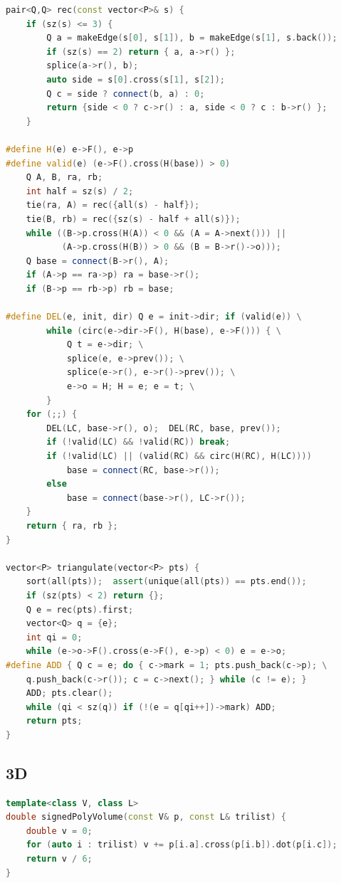 \begin{multicols}{\Columns}
\begin{lstlisting}[language=C++]
pair<Q,Q> rec(const vector<P>& s) {
	if (sz(s) <= 3) {
		Q a = makeEdge(s[0], s[1]), b = makeEdge(s[1], s.back());
		if (sz(s) == 2) return { a, a->r() };
		splice(a->r(), b);
		auto side = s[0].cross(s[1], s[2]);
		Q c = side ? connect(b, a) : 0;
		return {side < 0 ? c->r() : a, side < 0 ? c : b->r() };
	}

#define H(e) e->F(), e->p
#define valid(e) (e->F().cross(H(base)) > 0)
	Q A, B, ra, rb;
	int half = sz(s) / 2;
	tie(ra, A) = rec({all(s) - half});
	tie(B, rb) = rec({sz(s) - half + all(s)});
	while ((B->p.cross(H(A)) < 0 && (A = A->next())) ||
	       (A->p.cross(H(B)) > 0 && (B = B->r()->o)));
	Q base = connect(B->r(), A);
	if (A->p == ra->p) ra = base->r();
	if (B->p == rb->p) rb = base;

#define DEL(e, init, dir) Q e = init->dir; if (valid(e)) \
		while (circ(e->dir->F(), H(base), e->F())) { \
			Q t = e->dir; \
			splice(e, e->prev()); \
			splice(e->r(), e->r()->prev()); \
			e->o = H; H = e; e = t; \
		}
	for (;;) {
		DEL(LC, base->r(), o);  DEL(RC, base, prev());
		if (!valid(LC) && !valid(RC)) break;
		if (!valid(LC) || (valid(RC) && circ(H(RC), H(LC))))
			base = connect(RC, base->r());
		else
			base = connect(base->r(), LC->r());
	}
	return { ra, rb };
}

vector<P> triangulate(vector<P> pts) {
	sort(all(pts));  assert(unique(all(pts)) == pts.end());
	if (sz(pts) < 2) return {};
	Q e = rec(pts).first;
	vector<Q> q = {e};
	int qi = 0;
	while (e->o->F().cross(e->F(), e->p) < 0) e = e->o;
#define ADD { Q c = e; do { c->mark = 1; pts.push_back(c->p); \
	q.push_back(c->r()); c = c->next(); } while (c != e); }
	ADD; pts.clear();
	while (qi < sz(q)) if (!(e = q[qi++])->mark) ADD;
	return pts;
}
\end{lstlisting}


\subsection{3D}
\begin{lstlisting}[language=C++]
template<class V, class L>
double signedPolyVolume(const V& p, const L& trilist) {
	double v = 0;
	for (auto i : trilist) v += p[i.a].cross(p[i.b]).dot(p[i.c]);
	return v / 6;
}
\end{lstlisting}


\end{multicols}
